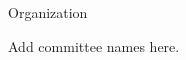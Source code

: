 \documentclass[letterpaper,compsoc,onecolumn,twoside,english]{IEEEtran}
\begin{document}
\Large{Organization}

Add committee names here.
\end{document}
